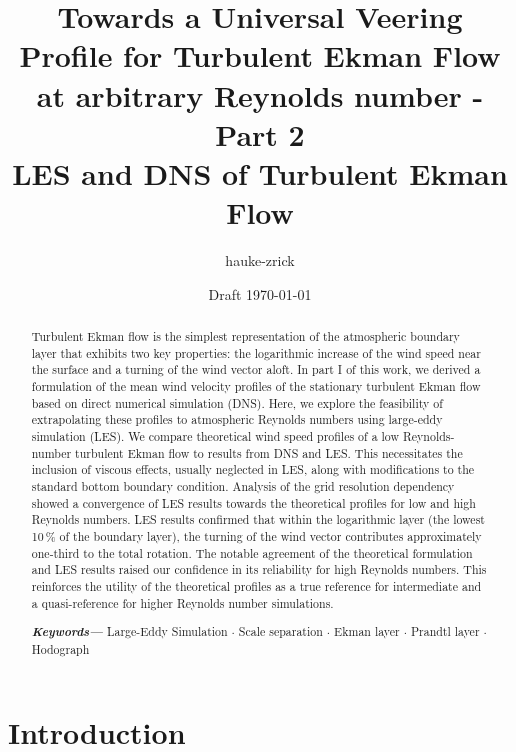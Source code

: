\documentclass[a4paper,11pt]{article}
\author{hauke-zrick}
\date{Draft \today}
\title{Towards a Universal Veering Profile for Turbulent Ekman Flow at arbitrary Reynolds number - Part 2\\
  \normalsize LES and DNS of Turbulent Ekman Flow \\}
\providecommand{\keywords}[1]
{
  \small	
  \textbf{\textit{Keywords---}} #1
}
\begin{document}
 

\maketitle

\begin{abstract}
	Turbulent Ekman flow is the simplest representation of the atmospheric boundary layer that exhibits two key properties: the logarithmic increase of the wind speed near the surface and a turning of the wind vector aloft. In part I of this work, we derived a formulation of the mean wind velocity profiles of the stationary turbulent Ekman flow based on direct numerical simulation (DNS). Here, we explore the feasibility of extrapolating these profiles to atmospheric Reynolds numbers using large-eddy simulation (LES).
  We compare theoretical wind speed profiles of a low Reynolds-number turbulent Ekman flow to results from DNS and LES. This necessitates the inclusion of viscous effects, usually neglected in LES, along with modifications to the standard bottom boundary condition.
	Analysis of the grid resolution dependency showed a convergence of LES results towards the theoretical profiles for low and high Reynolds numbers. LES results confirmed that within the logarithmic layer (the lowest 10\,\% of the boundary layer), the turning of the wind vector contributes approximately one-third to the total rotation.
  The notable agreement of the theoretical formulation and LES  results raised our confidence in its reliability for high Reynolds numbers. This reinforces the utility of the theoretical profiles as a true reference for intermediate and a quasi-reference for higher Reynolds number simulations.
%


\keywords{Large-Eddy Simulation $\cdot$ Scale separation $\cdot$ Ekman layer $\cdot$ Prandtl layer $\cdot$ Hodograph}
\end{abstract}
%
%
\section{Introduction}
\end{document}
